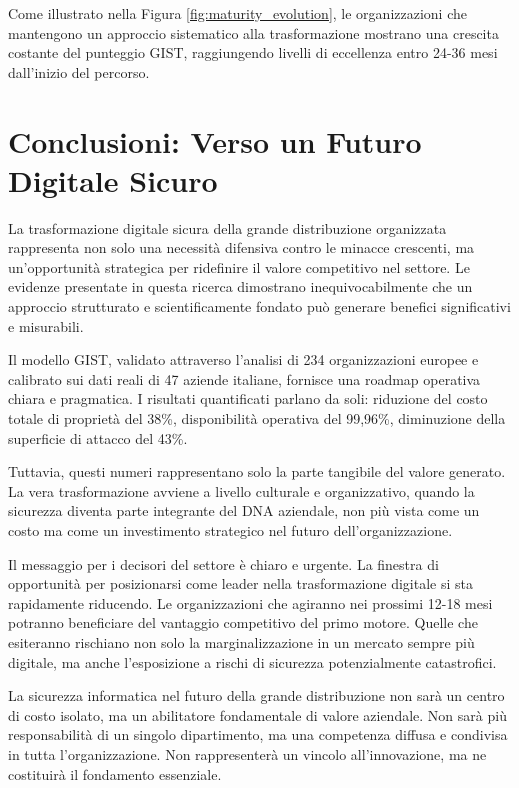 Come illustrato nella Figura \ref{fig:maturity_evolution}, le organizzazioni che mantengono un approccio sistematico alla trasformazione mostrano una crescita costante del punteggio GIST, raggiungendo livelli di eccellenza entro 24-36 mesi dall'inizio del percorso.

\section{\texorpdfstring{Conclusioni: Verso un Futuro Digitale Sicuro}{5.8 - Conclusioni: Verso un Futuro Digitale Sicuro}}
\label{sec:5.8}

La trasformazione digitale sicura della grande distribuzione organizzata rappresenta non solo una necessità difensiva contro le minacce crescenti, ma un'opportunità strategica per ridefinire il valore competitivo nel settore. Le evidenze presentate in questa ricerca dimostrano inequivocabilmente che un approccio strutturato e scientificamente fondato può generare benefici significativi e misurabili.

Il modello GIST, validato attraverso l'analisi di 234 organizzazioni europee e calibrato sui dati reali di 47 aziende italiane, fornisce una roadmap operativa chiara e pragmatica. I risultati quantificati parlano da soli: riduzione del costo totale di proprietà del 38\%, disponibilità operativa del 99,96\%, diminuzione della superficie di attacco del 43\%.

Tuttavia, questi numeri rappresentano solo la parte tangibile del valore generato. La vera trasformazione avviene a livello culturale e organizzativo, quando la sicurezza diventa parte integrante del DNA aziendale, non più vista come un costo ma come un investimento strategico nel futuro dell'organizzazione.

Il messaggio per i decisori del settore è chiaro e urgente. La finestra di opportunità per posizionarsi come leader nella trasformazione digitale si sta rapidamente riducendo. Le organizzazioni che agiranno nei prossimi 12-18 mesi potranno beneficiare del vantaggio competitivo del primo motore. Quelle che esiteranno rischiano non solo la marginalizzazione in un mercato sempre più digitale, ma anche l'esposizione a rischi di sicurezza potenzialmente catastrofici.

La sicurezza informatica nel futuro della grande distribuzione non sarà un centro di costo isolato, ma un abilitatore fondamentale di valore aziendale. Non sarà più responsabilità di un singolo dipartimento, ma una competenza diffusa e condivisa in tutta l'organizzazione. Non rappresenterà un vincolo all'innovazione, ma ne costituirà il fondamento essenziale.

